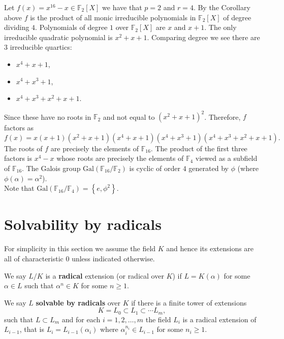 \documentclass[12pt, a4paper]{article}
\newcommand{\gal}{\text{Gal}}
\begin{document}
\begin{mdexample}
    Let \(f(x)=x^{16}-x \in \mathbb{F}_2[X]\) we have that \(p=2\) and \(r=4\). By the Corollary above \(f\) is the product of all monic irreducible polynomials in \(\mathbb{F}_2[X]\) of degree dividing \(4\). Polynomials of degree \(1\) over \(\mathbb{F}_2[X]\) are \(x\) and \(x+1\). The only irreducible quadratic polynomial is \(x^2+x+1\). Comparing degree we see there are \(3\) irreducible quartics:
    \begin{itemize}
        \item \(x^4+x+1\),
        \item \(x^4+x^3+1\),
        \item \(x^4+x^3+x^2+x+1\).
    \end{itemize}
    Since these have no roots in \(\mathbb{F}_2\) and not equal to \((x^2+x+1)^2\). Therefore, \(f\) factors as 
    \[f(x)=x(x+1)(x^2+x+1)(x^4+x+1)(x^4+x^3+1)(x^4+x^3+x^2+x+1).\]
    The roots of \(f\) are precisely the elements of \(\mathbb{F}_{16}\). The product of the first three factors is \(x^4-x\) whose roots are precisely the elements of \(\mathbb{F}_4\) viewed as a subfield of \(\mathbb{F}_{16}\). The Galois group \(\gal(\mathbb{F}_{16}/\mathbb{F}_2)\) is cyclic of order \(4\) generated by \(\phi\) (where \(\phi(\alpha)=\alpha^2\)).\\
    
    Note that \(\gal(\mathbb{F}_{16}/\mathbb{F}_4)=\left\{ e,\phi^2 \right\}\).
\end{mdexample}

\section{Solvability by radicals}

\begin{mdremark}
    For simplicity in this section we assume the field \(K\) and hence its extensions are all of characteristic \(0\) unless indicated otherwise.
\end{mdremark}

\begin{definition}
    We say \(L/K\) is a \textbf{radical} extension (or radical over \(K\)) if \(L=K(\alpha)\) for some \(\alpha \in L\) such that \(\alpha^n \in K\) for some \(n\geq 1\).
\end{definition}

\begin{definition}
    We say \(L\) \textbf{solvable by radicals} over \(K\) if there is a finite tower of extensions
    \[K = L_0 \subset L_1 \subset \cdots L_m,\]
    such that \(L \subset L_m\) and for each \(i=1,2,\ldots,m\) the field \(L_i\) is a radical extension of \(L_{i-1}\), that is \(L_i =L_{i-1}(\alpha_i)\) where \(\alpha_i^{n_i} \in L_{i-1}\) for some \(n_i\geq 1\).
\end{definition}
\end{document}
